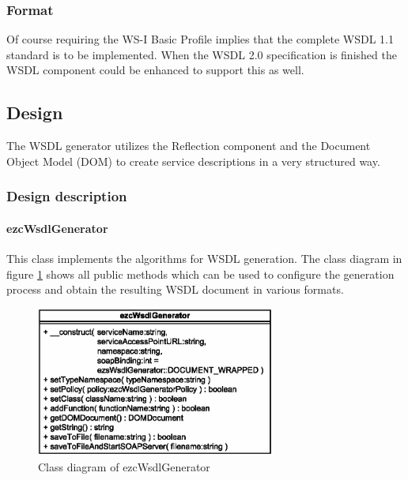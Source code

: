 \documentclass[10pt,final,a4paper,oneside]{article}
\begin{document}
\subsubsection{Format}
Of course requiring the WS-I Basic Profile implies
that the complete WSDL 1.1 standard is to be implemented.
When the WSDL 2.0 specification \cite{WSDL20} is finished
the WSDL component could be enhanced to support this as well.


\subsection{Design}\label{subsec:WSDLDesign}
%
%
The WSDL generator utilizes the Reflection component
and the Document Object Model (DOM)
to create service descriptions in a very structured way.



\subsubsection{Design description}

\paragraph{ezcWsdlGenerator}
This class implements the algorithms for WSDL generation.
The class diagram in figure \ref{fig:ezcWsdlGenerator.class-diagram}
shows all public methods which can be used 
to configure the generation process and
obtain the resulting WSDL document in various formats.

\begin{figure}[htbp]
	\centering
		\includegraphics[width=0.70\textwidth]{figures/ezcWsdlGenerator.class-diagram.eps}
	\caption{Class diagram of ezcWsdlGenerator}
	\label{fig:ezcWsdlGenerator.class-diagram}
\end{figure}
\end{document}
